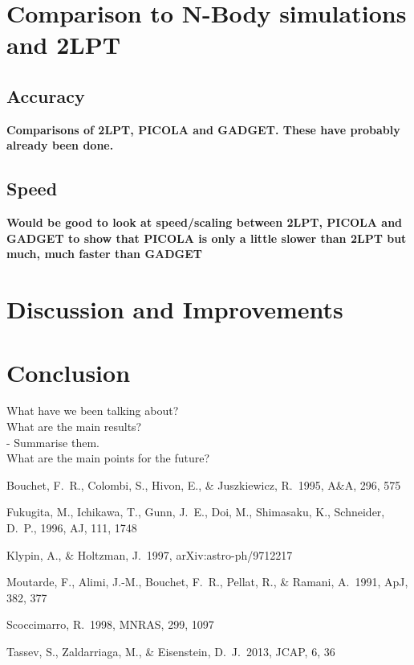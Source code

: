 \documentclass[5p,authoryear]{elsarticle}
\begin{document}
\section{Comparison to N-Body simulations and 2LPT}

\subsection{Accuracy}

\textbf{Comparisons of 2LPT, PICOLA and GADGET. These have probably already been done.}

\subsection{Speed}

\textbf{Would be good to look at speed/scaling between 2LPT, PICOLA and GADGET to show that PICOLA is only a little slower than 2LPT but much, much faster than GADGET}

\section{Discussion and Improvements}

\section{Conclusion}
What have we been talking about? \\
What are the main results? \\
 - Summarise them. \\
What are the main points for the future? 

\begin{thebibliography}{99}

 Bouchet, F.~R., Colombi, S., Hivon, E., \& Juszkiewicz, R.\ 1995, A\&A, 296, 575 

  Fukugita, M., Ichikawa, T., Gunn, J.~E., Doi, M., Shimasaku, K.,  Schneider, D.~P., 1996, AJ, 111, 1748

 Klypin, A., \& Holtzman, J.\ 1997, arXiv:astro-ph/9712217 

 Moutarde, F., Alimi, 
J.-M., Bouchet, F.~R., Pellat, R., \& Ramani, A.\ 1991, ApJ, 382, 377 

 Scoccimarro, R.\ 1998, 
MNRAS, 299, 1097 

 Tassev, S., Zaldarriaga, 
M., \& Eisenstein, D.~J.\ 2013, JCAP, 6, 36 

\end{thebibliography}
\end{document}
